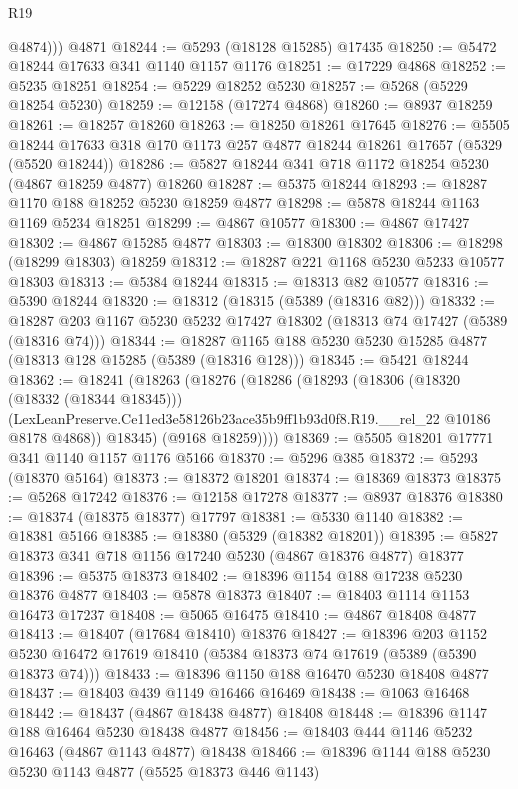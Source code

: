 \begin{lexlean}{R19}
\begin{coremodule}
          @4874)))
    @4871
@18244 := @5293 (@18128 @15285) @17435
@18250 := @5472 @18244 @17633 @341 @1140 @1157 @1176
@18251 := @17229 @4868
@18252 := @5235 @18251
@18254 := @5229 @18252 @5230
@18257 := @5268 (@5229 @18254 @5230)
@18259 := @12158 (@17274 @4868)
@18260 := @8937 @18259
@18261 := @18257 @18260
@18263 := @18250 @18261 @17645
@18276 := @5505 @18244 @17633 @318 @170 @1173 @257 @4877 @18244 @18261 @17657 (@5329 (@5520 @18244))
@18286 := @5827 @18244 @341 @718 @1172 @18254 @5230 (@4867 @18259 @4877) @18260
@18287 := @5375 @18244
@18293 := @18287 @1170 @188 @18252 @5230 @18259 @4877
@18298 := @5878 @18244 @1163 @1169 @5234 @18251
@18299 := @4867 @10577
@18300 := @4867 @17427
@18302 := @4867 @15285 @4877
@18303 := @18300 @18302
@18306 := @18298 (@18299 @18303) @18259
@18312 := @18287 @221 @1168 @5230 @5233 @10577 @18303
@18313 := @5384 @18244
@18315 := @18313 @82 @10577
@18316 := @5390 @18244
@18320 := @18312 (@18315 (@5389 (@18316 @82)))
@18332 := @18287 @203 @1167 @5230 @5232 @17427 @18302 (@18313 @74 @17427 (@5389 (@18316 @74)))
@18344 := @18287 @1165 @188 @5230 @5230 @15285 @4877 (@18313 @128 @15285 (@5389 (@18316 @128)))
@18345 := @5421 @18244
@18362 := @18241
    (@18263
      (@18276
        (@18286
          (@18293
            (@18306
              (@18320 (@18332 (@18344 @18345)))
              (LexLeanPreserve.Ce11ed3e58126b23ace35b9ff1b93d0f8.R19.__rel_22 @10186 @8178 @4868))
            @18345)
          (@9168 @18259))))
@18369 := @5505 @18201 @17771 @341 @1140 @1157 @1176 @5166
@18370 := @5296 @385
@18372 := @5293 (@18370 @5164)
@18373 := @18372 @18201
@18374 := @18369 @18373
@18375 := @5268 @17242
@18376 := @12158 @17278
@18377 := @8937 @18376
@18380 := @18374 (@18375 @18377) @17797
@18381 := @5330 @1140
@18382 := @18381 @5166
@18385 := @18380 (@5329 (@18382 @18201))
@18395 := @5827 @18373 @341 @718 @1156 @17240 @5230 (@4867 @18376 @4877) @18377
@18396 := @5375 @18373
@18402 := @18396 @1154 @188 @17238 @5230 @18376 @4877
@18403 := @5878 @18373
@18407 := @18403 @1114 @1153 @16473 @17237
@18408 := @5065 @16475
@18410 := @4867 @18408 @4877
@18413 := @18407 (@17684 @18410) @18376
@18427 := @18396
    @203
    @1152
    @5230
    @16472
    @17619
    @18410
    (@5384 @18373 @74 @17619 (@5389 (@5390 @18373 @74)))
@18433 := @18396 @1150 @188 @16470 @5230 @18408 @4877
@18437 := @18403 @439 @1149 @16466 @16469
@18438 := @1063 @16468
@18442 := @18437 (@4867 @18438 @4877) @18408
@18448 := @18396 @1147 @188 @16464 @5230 @18438 @4877
@18456 := @18403 @444 @1146 @5232 @16463 (@4867 @1143 @4877) @18438
@18466 := @18396 @1144 @188 @5230 @5230 @1143 @4877 (@5525 @18373 @446 @1143)

\end{coremodule}
\end{lexlean}
